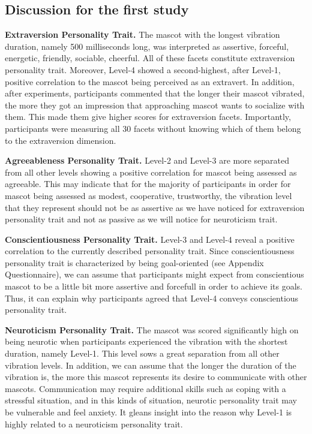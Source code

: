 \subsection{Discussion for the first study}
\par \textbf{Extraversion Personality Trait.} The mascot with the longest vibration duration, namely 500 milliseconds long, was interpreted as assertive, forceful, energetic, friendly, sociable, cheerful. All of these facets constitute extraversion personality trait. Moreover, Level-4 showed a second-highest, after Level-1, positive correlation to the mascot being perceived as an extravert. In addition, after experiments, participants commented that the longer their mascot vibrated, the more they got an impression that approaching mascot wants to socialize with them. This made them give higher scores for extraversion facets. Importantly, participants were measuring all 30 facets without knowing which of them belong to the extraversion dimension. 
\par \textbf{Agreeableness Personality Trait.} Level-2 and Level-3 are more separated from all other levels showing a positive correlation for mascot being assessed as agreeable. This may indicate that for the majority of participants in order for mascot being assessed as modest, cooperative, trustworthy, the vibration level that they represent should not be as assertive as we have noticed for extraversion personality trait and not as passive as we will notice for neuroticism trait. 
\par \textbf{Conscientiousness Personality Trait.} Level-3 and Level-4 reveal a positive correlation to the currently described personality trait. Since conscientiousness personality trait is characterized by being goal-oriented (see Appendix Questionnaire), we can assume that participants might expect from conscientious mascot to be a little bit more assertive and forcefull in order to achieve its goals. Thus, it can explain why participants agreed that Level-4 conveys conscientious personality trait.
\par \textbf{Neuroticism Personality Trait.} The mascot was scored significantly high on being neurotic when participants experienced the vibration with the shortest duration, namely Level-1. This level sows a great separation from all other vibration levels. In addition, we can assume that the longer the duration of the vibration is, the more this mascot represents its desire to communicate with other mascots. Communication may require additional skills such as coping with a stressful situation, and in this kinds of situation, neurotic personality trait may be vulnerable and feel anxiety. It gleans insight into the reason why Level-1 is highly related to a neuroticism personality trait.
